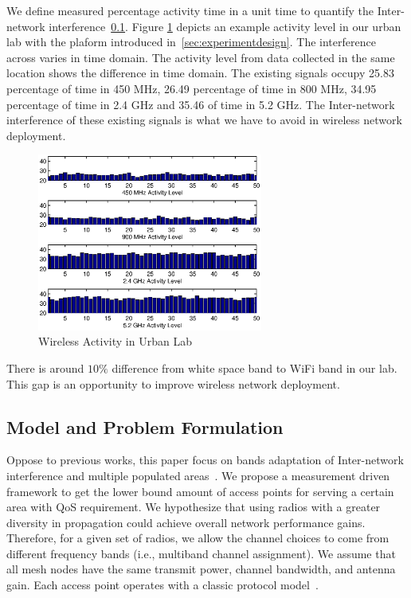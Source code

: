 We define measured percentage activity time in a unit time to 
quantify the Inter-network interference~\ref{subsec:problem}.
Figure \ref{fig:labact} depicts an example activity level in our urban lab
with the plaform introduced in~\ref{sec:experimentdesign}. 
The interference across varies in time domain. The activity level from data
collected in the same location shows the difference in time domain.
The existing signals occupy 25.83 percentage of time in 450 MHz,
26.49 percentage of time in 800 MHz, 34.95 percentage of time in 
2.4 GHz and 35.46 of time in 5.2 GHz. The Inter-network interference 
of these existing signals is what we have to avoid in wireless network
 deployment. 
   \begin{figure}
   \centering
   \includegraphics[width=74mm]{figures/labactivity}
   \vspace{-0.1in}
   \caption{Wireless Activity in Urban Lab}                                                                 
   \label{fig:labact}
   \end{figure}
There is around $10\%$ difference from white space band to WiFi band in 
our lab. This gap is an opportunity to improve wireless network deployment.

\subsection{Model and Problem Formulation}
\label{subsec:problem}

Oppose to previous works, this paper focus on bands adaptation of Inter-network 
interference and multiple populated areas~\cite{tang2005interference,yuan2006cross
,si2010overview}. We propose a measurement driven framework to get the lower bound 
amount of access points for serving a certain area with QoS requirement.
 We hypothesize that using radios with a greater diversity in propagation could 
 achieve overall network performance gains.  Therefore, for a given set of radios,
  we allow the channel choices to come from different frequency bands 
  (i.e., multiband channel assignment). We assume that all mesh nodes have the same 
  transmit power, channel bandwidth, and antenna gain.
Each access point operates with a classic protocol model~\cite{gupta2000capacity}. 

